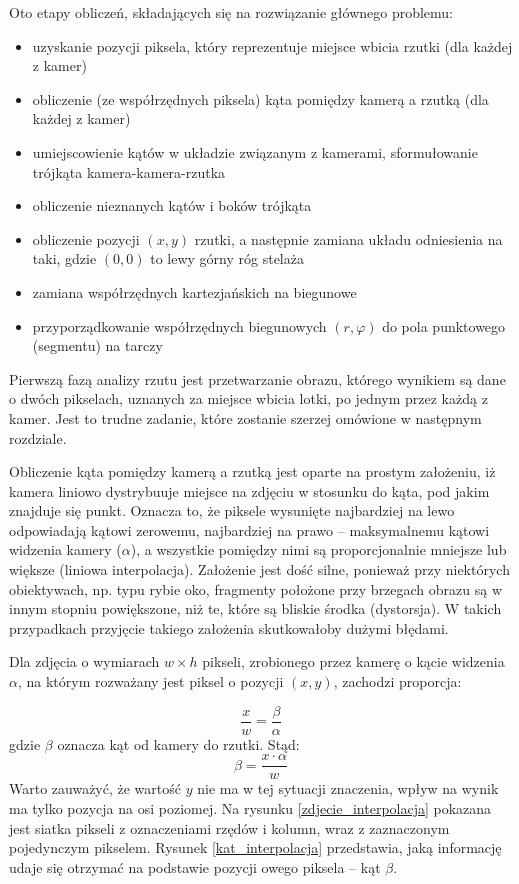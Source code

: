 Oto etapy obliczeń, składających się na rozwiązanie głównego problemu:
\begin{itemize}
  \item uzyskanie pozycji piksela, który reprezentuje miejsce wbicia rzutki (dla każdej z kamer)
  \item obliczenie (ze współrzędnych piksela) kąta pomiędzy kamerą a rzutką  (dla każdej z kamer)
  \item umiejscowienie kątów w układzie związanym z kamerami, sformułowanie trójkąta kamera-kamera-rzutka
  \item obliczenie nieznanych kątów i boków trójkąta
  \item obliczenie pozycji $(x, y)$ rzutki, a następnie zamiana układu odniesienia na taki, gdzie $(0, 0)$ to lewy górny róg stelaża
  \item zamiana współrzędnych kartezjańskich na biegunowe
  \item przyporządkowanie współrzędnych biegunowych $(r, \varphi)$ do pola punktowego (segmentu) na tarczy
\end{itemize}


Pierwszą fazą analizy rzutu jest przetwarzanie obrazu, którego wynikiem są dane o dwóch pikselach, uznanych za miejsce wbicia lotki, po jednym przez każdą z kamer. Jest to trudne zadanie, które zostanie szerzej omówione w następnym rozdziale. 

Obliczenie kąta pomiędzy kamerą a rzutką jest oparte na prostym założeniu, iż kamera liniowo dystrybuuje miejsce na zdjęciu w stosunku do kąta, pod jakim znajduje się punkt. Oznacza to, że piksele wysunięte najbardziej na lewo odpowiadają kątowi zerowemu, najbardziej na prawo -- maksymalnemu kątowi widzenia kamery ($\alpha$), a wszystkie pomiędzy nimi są proporcjonalnie mniejsze lub większe (liniowa interpolacja). Założenie jest dość silne, ponieważ przy niektórych obiektywach, np. typu rybie oko, fragmenty położone przy brzegach obrazu są w innym stopniu powiększone, niż te, które są bliskie środka (dystorsja). W takich przypadkach przyjęcie takiego założenia skutkowałoby dużymi błędami. 

Dla zdjęcia o wymiarach $w \times h$ pikseli, zrobionego przez kamerę o kącie widzenia $\alpha$, na którym rozważany jest piksel o pozycji $(x, y)$, zachodzi proporcja:

$$
\frac{x}{w} = \frac{\beta}{\alpha}
$$ gdzie $\beta$ oznacza kąt od kamery do rzutki. 
Stąd:
$$
\beta = \frac{x \cdot \alpha}{w}
$$
Warto zauważyć, że wartość $y$ nie ma w tej sytuacji znaczenia, wpływ na wynik ma tylko pozycja na osi poziomej. Na rysunku \ref{zdjecie_interpolacja} pokazana jest siatka pikseli z oznaczeniami rzędów i kolumn, wraz z zaznaczonym pojedynczym pikselem. Rysunek \ref{kat_interpolacja} przedstawia, jaką informację udaje się otrzymać na podstawie pozycji owego piksela -- kąt $\beta$.


